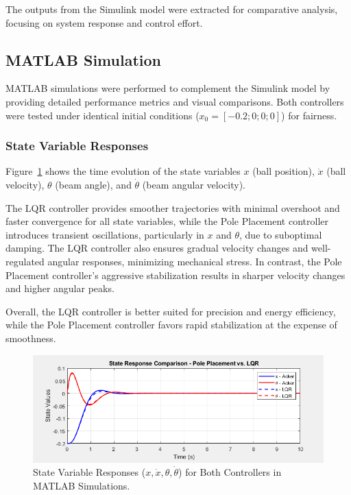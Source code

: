 \documentclass[conference]{IEEEtran}
\begin{document}
The outputs from the Simulink model were extracted for comparative analysis, focusing on system response and control effort.

\subsection{MATLAB Simulation}
\label{subsec:matlab_simulation}

MATLAB simulations were performed to complement the Simulink model by providing detailed performance metrics and visual comparisons. Both controllers were tested under identical initial conditions (\(x_0 = [-0.2; 0; 0; 0]\)) for fairness.

\subsubsection{State Variable Responses}
Figure~\ref{fig:state_sim} shows the time evolution of the state variables \(x\) (ball position), \(\dot{x}\) (ball velocity), \(\theta\) (beam angle), and \(\dot{\theta}\) (beam angular velocity). 

The LQR controller provides smoother trajectories with minimal overshoot and faster convergence for all state variables, while the Pole Placement controller introduces transient oscillations, particularly in \(x\) and \(\theta\), due to suboptimal damping. The LQR controller also ensures gradual velocity changes and well-regulated angular responses, minimizing mechanical stress. In contrast, the Pole Placement controller’s aggressive stabilization results in sharper velocity changes and higher angular peaks. 

Overall, the LQR controller is better suited for precision and energy efficiency, while the Pole Placement controller favors rapid stabilization at the expense of smoothness.

\begin{figure}[H]
    \centering
    \includegraphics[width=0.8\linewidth]{figures/state_sim.png}
    \caption{State Variable Responses (\(x, \dot{x}, \theta, \dot{\theta}\)) for Both Controllers in MATLAB Simulations.}
    \label{fig:state_sim}
\end{figure}
\end{document}
